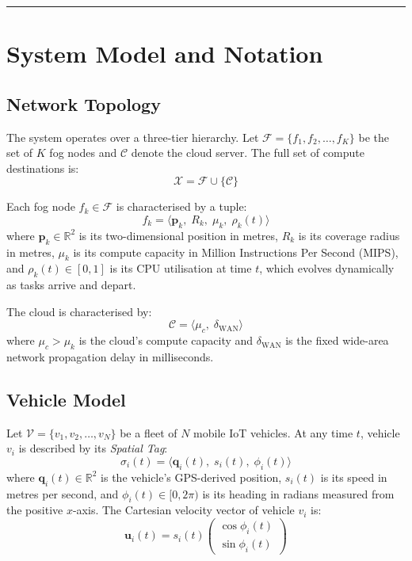 \documentclass[12pt,a4paper]{article}
\theoremstyle{definition}
\theoremstyle{remark}
\begin{document}
\vspace{0.5cm}\hrule\vspace{0.7cm}
\tableofcontents
\newpage

\section{System Model and Notation}
\label{sec:system}

\subsection{Network Topology}

The system operates over a three-tier hierarchy. Let
$\mathcal{F} = \{f_1, f_2, \ldots, f_K\}$ be the set of $K$ fog nodes and
$\mathcal{C}$ denote the cloud server. The full set of compute destinations is:
\begin{equation}
  \mathcal{X} = \mathcal{F} \cup \{\mathcal{C}\}
\end{equation}

Each fog node $f_k \in \mathcal{F}$ is characterised by a tuple:
\begin{equation}
  f_k = \langle \bm{p}_k,\; R_k,\; \mu_k,\; \rho_k(t) \rangle
\end{equation}
where $\bm{p}_k \in \mathbb{R}^2$ is its two-dimensional position in metres,
$R_k$ is its coverage radius in metres, $\mu_k$ is its compute capacity in
Million Instructions Per Second (MIPS), and $\rho_k(t) \in [0,1]$ is its CPU
utilisation at time $t$, which evolves dynamically as tasks arrive and depart.

The cloud is characterised by:
\begin{equation}
  \mathcal{C} = \langle \mu_c,\; \delta_{\text{WAN}} \rangle
\end{equation}
where $\mu_c > \mu_k$ is the cloud's compute capacity and
$\delta_{\text{WAN}}$ is the fixed wide-area network propagation delay in milliseconds.

\subsection{Vehicle Model}

Let $\mathcal{V} = \{v_1, v_2, \ldots, v_N\}$ be a fleet of $N$ mobile IoT
vehicles. At any time $t$, vehicle $v_i$ is described by its \emph{Spatial Tag}:
\begin{equation}
  \sigma_i(t) = \langle \bm{q}_i(t),\; s_i(t),\; \phi_i(t) \rangle
\end{equation}
where $\bm{q}_i(t) \in \mathbb{R}^2$ is the vehicle's GPS-derived position,
$s_i(t)$ is its speed in metres per second, and $\phi_i(t) \in [0, 2\pi)$
is its heading in radians measured from the positive $x$-axis. The Cartesian
velocity vector of vehicle $v_i$ is:
\begin{equation}
  \bm{u}_i(t) = s_i(t) \begin{pmatrix} \cos\phi_i(t) \\ \sin\phi_i(t) \end{pmatrix}
\end{equation}
\end{document}
